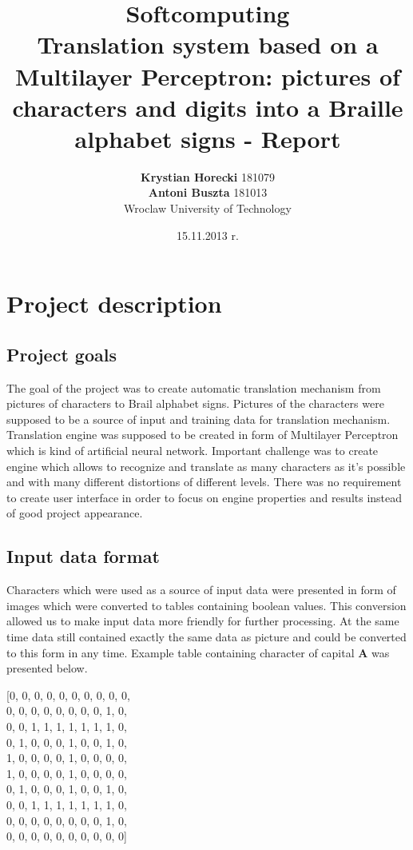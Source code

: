 \documentclass[a4paper]{article}
\title{Softcomputing \\ Translation system based on a Multilayer Perceptron: pictures of characters and digits into a Braille alphabet
signs - Report}
\author{\textbf{Krystian Horecki} 181079 \\ 
	\textbf{Antoni Buszta} 181013 \\
	Wroclaw University of Technology}
\date{15.11.2013 r.}
\begin{document}
\maketitle
\newpage
\onehalfspace

\section{Project description}
\subsection{Project goals} 
The goal of the project was to create automatic translation mechanism from pictures of characters to Brail alphabet signs.
Pictures of the characters were supposed to be a source of input and training data for translation mechanism.
Translation engine was supposed to be created in form of Multilayer Perceptron which is kind of artificial neural network.
Important challenge was to create engine which allows to recognize and translate as many characters as it's possible and with many different distortions of different levels.
There was no requirement to create user interface in order to focus on engine properties and results instead of good project appearance.
\subsection{Input data format}
Characters which were used as a source of input data were presented in form of images which were converted to tables containing boolean values.
This conversion allowed us to make input data more friendly for further processing. At the same time data still contained exactly the same data as picture and could be converted to this form in any time.
Example table containing character of capital \textbf{A} was presented below. \\
\begin{center}
		[0, 0, 0, 0, 0, 0, 0, 0, 0, 0,\\
        0, 0, 0, 0, 0, 0, 0, 0, 1, 0,\\
        0, 0, 1, 1, 1, 1, 1, 1, 1, 0,\\
        0, 1, 0, 0, 0, 1, 0, 0, 1, 0,\\
        1, 0, 0, 0, 0, 1, 0, 0, 0, 0,\\
        1, 0, 0, 0, 0, 1, 0, 0, 0, 0,\\
        0, 1, 0, 0, 0, 1, 0, 0, 1, 0,\\
        0, 0, 1, 1, 1, 1, 1, 1, 1, 0,\\
        0, 0, 0, 0, 0, 0, 0, 0, 1, 0,\\
        0, 0, 0, 0, 0, 0, 0, 0, 0, 0]\\
\end{center}
 
\end{document}
